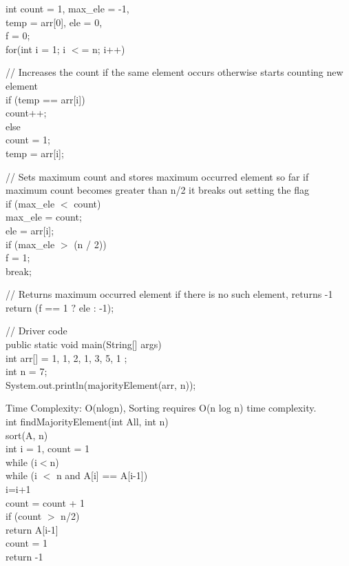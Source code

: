 \documentclass[10pt,letterpaper]{article}
\begin{document}
\begin{itemize}
\begin{itemize}
{{	int count = 1, max_ele = -1,\\
		temp = arr[0], ele = 0,\\
			f = 0;\\

	for(int i = 1; i $<$= n; i++)\\
	{
		
		// Increases the count if the same element occurs otherwise starts counting new element\\
		if (temp == arr[i])\\
		{
			count++;\\
		}
		else\\
		{
			count = 1;\\
			temp = arr[i];\\
		}

		// Sets maximum count and stores maximum occurred element so far if maximum count becomes greater than n/2 it breaks out setting the flag\\
		if (max_ele $<$ count)\\
		{
			max_ele = count;\\
			ele = arr[i];\\

			if (max_ele $>$ (n / 2))\\
			{
				f = 1;\\
				break;\\
			}
		}
	}

	// Returns maximum occurred element if there is no such element, returns -1\\
	return (f == 1 $?$ ele : -1);\\
}

// Driver code\\
public static void main(String[] args)\\
{
	int arr[] = { 1, 1, 2, 1, 3, 5, 1 };\\
	int n = 7;\\

	System.out.println(majorityElement(arr, n));\\
}
}

Time Complexity: O(nlogn), Sorting requires O(n log n) time complexity.\\

int findMajorityElement(int All, int n)\\
sort(A, n)\\
int i = 1, count = 1\\
while (i$<$n)\\
{
while (i $<$ n and A[i] == A[i-1])\\
{
i=i+1\\
count = count + 1\\
}
if (count $>$ n/2)\\
return A[i-1]\\
count = 1\\
}
return -1\\


\end{itemize}
\end{itemize}
\end{document}
